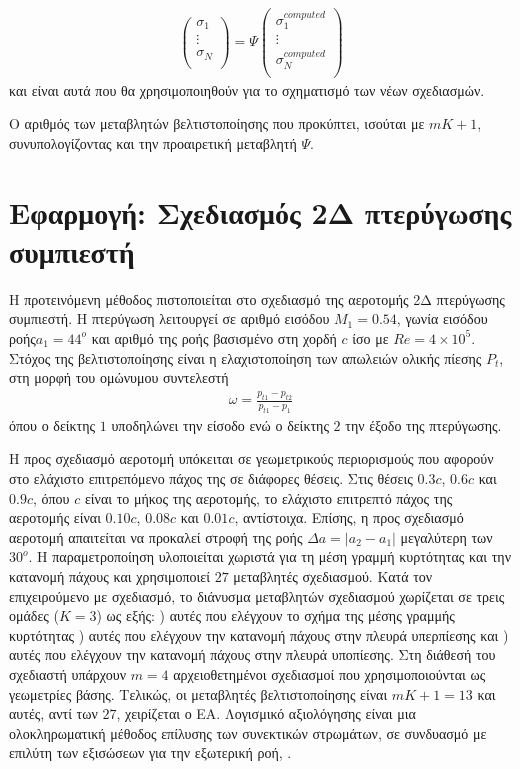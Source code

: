 \begin{eqnarray}
		\left( {\begin{array}{c}
 		\sigma _1  \\
 		\vdots  \\
 		\sigma _N  \\
 		\end{array} } \right) =
 		\Psi  
 		\left( {\begin{array}{c}
 		\sigma _1^{computed}  \\
 		\vdots  \\
 		\sigma _N^{computed}  \\
 		\end{array} } \right)
   \label{cdf-matrix-2} 
\end{eqnarray}
και είναι αυτά που θα χρησιμοποιηθούν για το σχηματισμό των νέων σχεδιασμών. 

Ο αριθμός των μεταβλητών βελτιστοποίησης που προκύπτει, ισούται με $m K+1$, συνυπολογίζοντας και την προαιρετική μεταβλητή  $\Psi$.


\section{Εφαρμογή: Σχεδιασμός 2Δ πτερύγωσης συμπιεστή}
\label{Drela1}
Η προτεινόμενη μέθοδος πιστοποιείται στο σχεδιασμό της αεροτομής 2Δ πτερύγωσης συμπιεστή. Η πτερύγωση λειτουργεί σε αριθμό  εισόδου $M_1=0.54$, γωνία εισόδου ροής$a_1=44^o$ και αριθμό  της ροής βασισμένο στη χορδή $c$ ίσο με $Re=4\times10^5$. Στόχος της βελτιστοποίησης είναι η ελαχιστοποίηση των απωλειών ολικής πίεσης $P_t$, στη μορφή του ομώνυμου συντελεστή   
\begin{eqnarray}
   \omega=\frac{p_{t1}-p_{t2}}{p_{t1}-p_1}
   \label{omegaLosses} 
\end{eqnarray}
όπου ο δείκτης $1$ υποδηλώνει την είσοδο ενώ ο δείκτης $2$ την έξοδο της πτερύγωσης.

Η προς σχεδιασμό αεροτομή υπόκειται σε γεωμετρικούς περιορισμούς που αφορούν στο ελάχιστο επιτρεπόμενο πάχος της σε διάφορες θέσεις. Στις θέσεις  $0.3c$, $0.6c$ και $0.9c$, όπου $c$ είναι το μήκος της αεροτομής, το ελάχιστο επιτρεπτό πάχος της αεροτομής είναι $0.10c$, $0.08c$ και $0.01c$, αντίστοιχα. Επίσης, η προς σχεδιασμό αεροτομή απαιτείται να προκαλεί στροφή της ροής $\Delta a= |a_2-a_1|$ μεγαλύτερη των $30^o$. Η παραμετροποίηση υλοποιείται χωριστά για τη μέση γραμμή κυρτότητας και την κατανομή πάχους και χρησιμοποιεί $27$ μεταβλητές σχεδιασμού. Κατά τον επιχειρούμενο με  σχεδιασμό, το διάνυσμα μεταβλητών σχεδιασμού χωρίζεται σε τρεις ομάδες ($K=3$) ως εξής: ) αυτές που ελέγχουν το σχήμα της μέσης γραμμής κυρτότητας ) αυτές που ελέγχουν την κατανομή πάχους στην πλευρά υπερπίεσης και ) αυτές που ελέγχουν την κατανομή πάχους στην πλευρά υποπίεσης. Στη διάθεσή του σχεδιαστή υπάρχουν $m=4$ αρχειοθετημένοι σχεδιασμοί που χρησιμοποιούνται ως γεωμετρίες βάσης. Τελικώς, οι μεταβλητές βελτιστοποίησης είναι $m K+1=13$ και αυτές, αντί των $27$, χειρίζεται ο ΕΑ. Λογισμικό αξιολόγησης είναι μια ολοκληρωματική μέθοδος επίλυσης των συνεκτικών στρωμάτων, σε συνδυασμό με επιλύτη των εξισώσεων  για την εξωτερική ροή, \cite{Drel1987}.          

